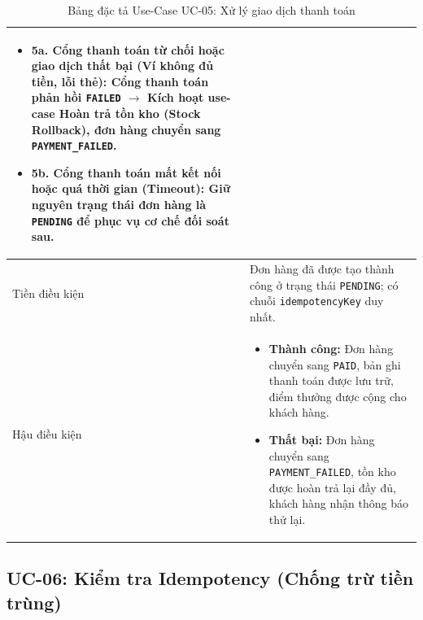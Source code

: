 \documentclass[12pt,a4paper]{article}
\begin{document}
\begin{table}[H]
\begin{tabularx}{\textwidth}{|>{\bfseries\raggedright\arraybackslash}p{3.2cm}|>{\raggedright\arraybackslash}X|}
\begin{itemize}[leftmargin=*,itemsep=2pt,topsep=2pt,parsep=0pt,partopsep=0pt]
    \item \textbf{5a. Cổng thanh toán từ chối hoặc giao dịch thất bại (Ví không đủ tiền, lỗi thẻ):} Cổng thanh toán phản hồi \texttt{FAILED} $\rightarrow$ Kích hoạt use-case Hoàn trả tồn kho (Stock Rollback), đơn hàng chuyển sang \texttt{PAYMENT\_FAILED}.
    \item \textbf{5b. Cổng thanh toán mất kết nối hoặc quá thời gian (Timeout):} Giữ nguyên trạng thái đơn hàng là \texttt{PENDING} để phục vụ cơ chế đối soát sau.
\end{itemize} \\
\hline
Tiền điều kiện & Đơn hàng đã được tạo thành công ở trạng thái \texttt{PENDING}; có chuỗi \texttt{idempotencyKey} duy nhất. \\
\hline
Hậu điều kiện & 
\begin{itemize}[leftmargin=*,itemsep=2pt,topsep=2pt,parsep=0pt,partopsep=0pt]
    \item \textbf{Thành công:} Đơn hàng chuyển sang \texttt{PAID}, bản ghi thanh toán được lưu trữ, điểm thưởng được cộng cho khách hàng.
    \item \textbf{Thất bại:} Đơn hàng chuyển sang \texttt{PAYMENT\_FAILED}, tồn kho được hoàn trả lại đầy đủ, khách hàng nhận thông báo thử lại.
\end{itemize} \\
\hline
\end{tabularx}
\caption{Bảng đặc tả Use-Case UC-05: Xử lý giao dịch thanh toán}
\label{tab:uc-05}
\end{table}

\subsection{UC-06: Kiểm tra Idempotency (Chống trừ tiền trùng)}
\end{document}
